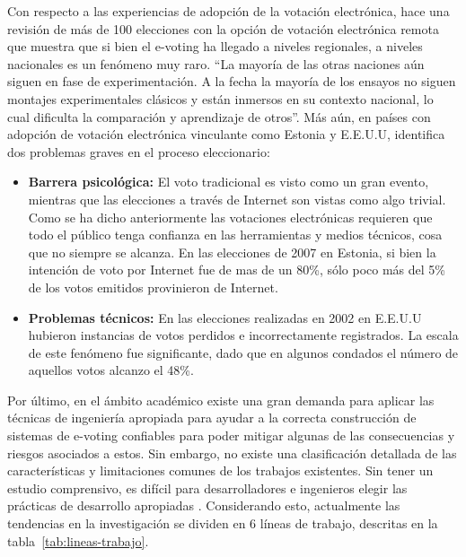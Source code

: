 Con respecto a las experiencias de adopción de la votación electrónica,  \cite{Krimmer2007} hace una revisión de más de 
100 elecciones con la opción de votación electrónica remota que muestra que si bien el e-voting ha 
llegado a niveles regionales, a niveles nacionales es un fenómeno muy raro. ``La mayoría de las otras naciones aún 
siguen en fase de experimentación. A la fecha la mayoría de los  ensayos no siguen montajes 
experimentales clásicos y están inmersos en su contexto nacional, lo cual dificulta la 
comparación y aprendizaje de otros''. Más aún, en países con adopción de votación electrónica vinculante
como Estonia y E.E.U.U, \cite{Kapczynski2009} identifica dos problemas graves en el proceso eleccionario: 

\begin{itemize}
	\item \textbf{Barrera psicológica:} El voto tradicional es visto como un gran evento, mientras que las 
		elecciones a través de Internet son vistas como algo trivial. Como se ha dicho anteriormente 
		las votaciones electrónicas requieren que todo el público tenga confianza en las herramientas y medios técnicos,
		cosa que no siempre se alcanza. En las elecciones de 2007 en Estonia, si bien la intención de 
		voto por Internet fue de mas de un 80\%, sólo poco más del 5\% de los votos emitidos provinieron de Internet.

	\item \textbf{Problemas técnicos:} En las elecciones realizadas en 2002 en E.E.U.U hubieron instancias 
		de votos perdidos e incorrectamente registrados. La escala de este fenómeno fue significante, dado que
		en algunos condados el número de aquellos votos alcanzo el 48\%.
		
\end{itemize}

Por último, en el ámbito académico existe una gran demanda para aplicar las técnicas de ingeniería apropiada
para ayudar a la correcta construcción de sistemas de e-voting confiables para poder mitigar algunas
de las consecuencias y riesgos asociados a estos. Sin embargo, no existe una clasificación detallada
de las características y limitaciones comunes de los trabajos existentes. Sin tener un estudio comprensivo,
es difícil para desarrolladores e ingenieros elegir las prácticas de desarrollo apropiadas \cite{Adida2006}. 
Considerando esto, actualmente las tendencias en la investigación se dividen en 6 líneas de trabajo, descritas
en la tabla~\ref{tab:lineas-trabajo}.

